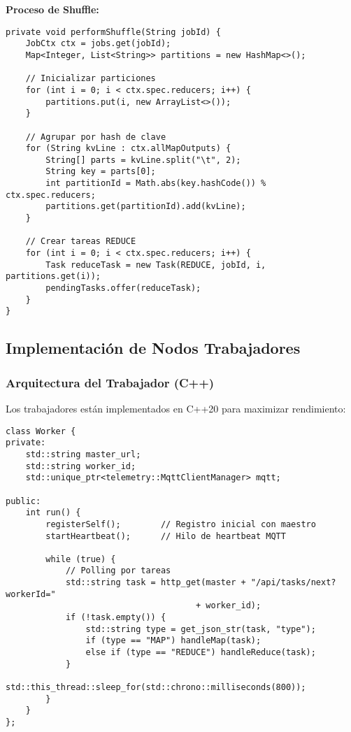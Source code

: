 \textbf{Proceso de Shuffle:}
\begin{verbatim}
private void performShuffle(String jobId) {
    JobCtx ctx = jobs.get(jobId);
    Map<Integer, List<String>> partitions = new HashMap<>();
    
    // Inicializar particiones
    for (int i = 0; i < ctx.spec.reducers; i++) {
        partitions.put(i, new ArrayList<>());
    }
    
    // Agrupar por hash de clave
    for (String kvLine : ctx.allMapOutputs) {
        String[] parts = kvLine.split("\t", 2);
        String key = parts[0];
        int partitionId = Math.abs(key.hashCode()) % ctx.spec.reducers;
        partitions.get(partitionId).add(kvLine);
    }
    
    // Crear tareas REDUCE
    for (int i = 0; i < ctx.spec.reducers; i++) {
        Task reduceTask = new Task(REDUCE, jobId, i, partitions.get(i));
        pendingTasks.offer(reduceTask);
    }
}
\end{verbatim}

\subsection{Implementación de Nodos Trabajadores}

\subsubsection{Arquitectura del Trabajador (C++)}

Los trabajadores están implementados en C++20 para maximizar rendimiento:

\begin{verbatim}
class Worker {
private:
    std::string master_url;
    std::string worker_id;
    std::unique_ptr<telemetry::MqttClientManager> mqtt;
    
public:
    int run() {
        registerSelf();        // Registro inicial con maestro
        startHeartbeat();      // Hilo de heartbeat MQTT
        
        while (true) {
            // Polling por tareas
            std::string task = http_get(master + "/api/tasks/next?workerId=" 
                                      + worker_id);
            if (!task.empty()) {
                std::string type = get_json_str(task, "type");
                if (type == "MAP") handleMap(task);
                else if (type == "REDUCE") handleReduce(task);
            }
            std::this_thread::sleep_for(std::chrono::milliseconds(800));
        }
    }
};
\end{verbatim}

